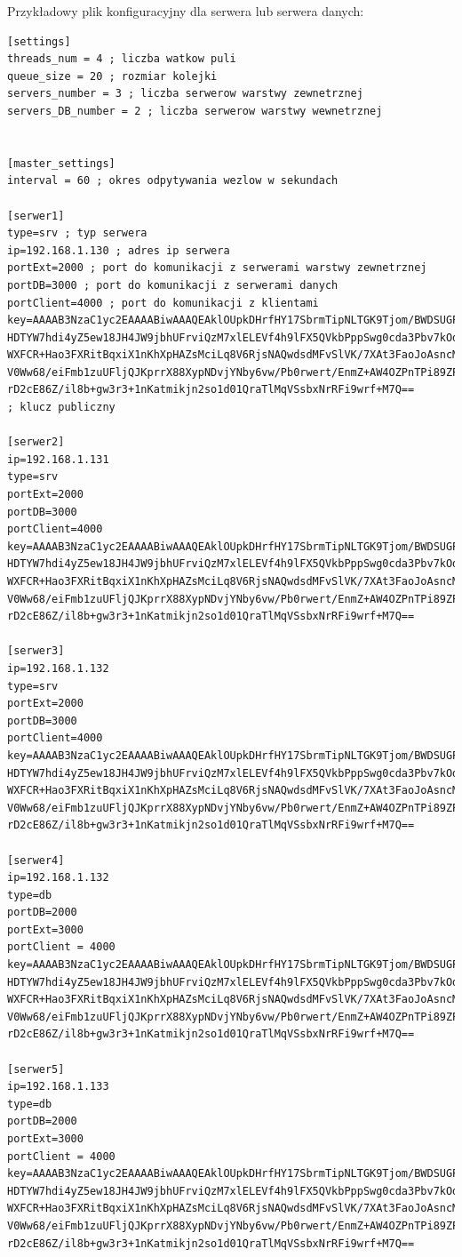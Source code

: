 Przykładowy plik konfiguracyjny dla serwera lub serwera danych:
\begin{lstlisting}[style=incode, caption=Plik konfiguracyjny serwera]
[settings]
threads_num = 4 ; liczba watkow puli
queue_size = 20 ; rozmiar kolejki
servers_number = 3 ; liczba serwerow warstwy zewnetrznej
servers_DB_number = 2 ; liczba serwerow warstwy wewnetrznej


[master_settings]
interval = 60 ; okres odpytywania wezlow w sekundach

[serwer1]
type=srv ; typ serwera
ip=192.168.1.130 ; adres ip serwera
portExt=2000 ; port do komunikacji z serwerami warstwy zewnetrznej
portDB=3000 ; port do komunikacji z serwerami danych
portClient=4000 ; port do komunikacji z klientami
key=AAAAB3NzaC1yc2EAAAABiwAAAQEAklOUpkDHrfHY17SbrmTipNLTGK9Tjom/BWDSUGPl+nafzl
HDTYW7hdi4yZ5ew18JH4JW9jbhUFrviQzM7xlELEVf4h9lFX5QVkbPppSwg0cda3Pbv7kOdJ/MtyBl
WXFCR+Hao3FXRitBqxiX1nKhXpHAZsMciLq8V6RjsNAQwdsdMFvSlVK/7XAt3FaoJoAsncM1Q9x5+3
V0Ww68/eiFmb1zuUFljQJKprrX88XypNDvjYNby6vw/Pb0rwert/EnmZ+AW4OZPnTPi89ZPmVMLuay
rD2cE86Z/il8b+gw3r3+1nKatmikjn2so1d01QraTlMqVSsbxNrRFi9wrf+M7Q== 
; klucz publiczny

[serwer2]
ip=192.168.1.131
type=srv
portExt=2000
portDB=3000
portClient=4000
key=AAAAB3NzaC1yc2EAAAABiwAAAQEAklOUpkDHrfHY17SbrmTipNLTGK9Tjom/BWDSUGPl+nafzl
HDTYW7hdi4yZ5ew18JH4JW9jbhUFrviQzM7xlELEVf4h9lFX5QVkbPppSwg0cda3Pbv7kOdJ/MtyBl
WXFCR+Hao3FXRitBqxiX1nKhXpHAZsMciLq8V6RjsNAQwdsdMFvSlVK/7XAt3FaoJoAsncM1Q9x5+3
V0Ww68/eiFmb1zuUFljQJKprrX88XypNDvjYNby6vw/Pb0rwert/EnmZ+AW4OZPnTPi89ZPmVMLuay
rD2cE86Z/il8b+gw3r3+1nKatmikjn2so1d01QraTlMqVSsbxNrRFi9wrf+M7Q==

[serwer3]
ip=192.168.1.132
type=srv
portExt=2000
portDB=3000
portClient=4000
key=AAAAB3NzaC1yc2EAAAABiwAAAQEAklOUpkDHrfHY17SbrmTipNLTGK9Tjom/BWDSUGPl+nafzl
HDTYW7hdi4yZ5ew18JH4JW9jbhUFrviQzM7xlELEVf4h9lFX5QVkbPppSwg0cda3Pbv7kOdJ/MtyBl
WXFCR+Hao3FXRitBqxiX1nKhXpHAZsMciLq8V6RjsNAQwdsdMFvSlVK/7XAt3FaoJoAsncM1Q9x5+3
V0Ww68/eiFmb1zuUFljQJKprrX88XypNDvjYNby6vw/Pb0rwert/EnmZ+AW4OZPnTPi89ZPmVMLuay
rD2cE86Z/il8b+gw3r3+1nKatmikjn2so1d01QraTlMqVSsbxNrRFi9wrf+M7Q==

[serwer4]
ip=192.168.1.132
type=db
portDB=2000
portExt=3000
portClient = 4000
key=AAAAB3NzaC1yc2EAAAABiwAAAQEAklOUpkDHrfHY17SbrmTipNLTGK9Tjom/BWDSUGPl+nafzl
HDTYW7hdi4yZ5ew18JH4JW9jbhUFrviQzM7xlELEVf4h9lFX5QVkbPppSwg0cda3Pbv7kOdJ/MtyBl
WXFCR+Hao3FXRitBqxiX1nKhXpHAZsMciLq8V6RjsNAQwdsdMFvSlVK/7XAt3FaoJoAsncM1Q9x5+3
V0Ww68/eiFmb1zuUFljQJKprrX88XypNDvjYNby6vw/Pb0rwert/EnmZ+AW4OZPnTPi89ZPmVMLuay
rD2cE86Z/il8b+gw3r3+1nKatmikjn2so1d01QraTlMqVSsbxNrRFi9wrf+M7Q==

[serwer5]
ip=192.168.1.133
type=db
portDB=2000
portExt=3000
portClient = 4000
key=AAAAB3NzaC1yc2EAAAABiwAAAQEAklOUpkDHrfHY17SbrmTipNLTGK9Tjom/BWDSUGPl+nafzl
HDTYW7hdi4yZ5ew18JH4JW9jbhUFrviQzM7xlELEVf4h9lFX5QVkbPppSwg0cda3Pbv7kOdJ/MtyBl
WXFCR+Hao3FXRitBqxiX1nKhXpHAZsMciLq8V6RjsNAQwdsdMFvSlVK/7XAt3FaoJoAsncM1Q9x5+3
V0Ww68/eiFmb1zuUFljQJKprrX88XypNDvjYNby6vw/Pb0rwert/EnmZ+AW4OZPnTPi89ZPmVMLuay
rD2cE86Z/il8b+gw3r3+1nKatmikjn2so1d01QraTlMqVSsbxNrRFi9wrf+M7Q==
\end{lstlisting}

